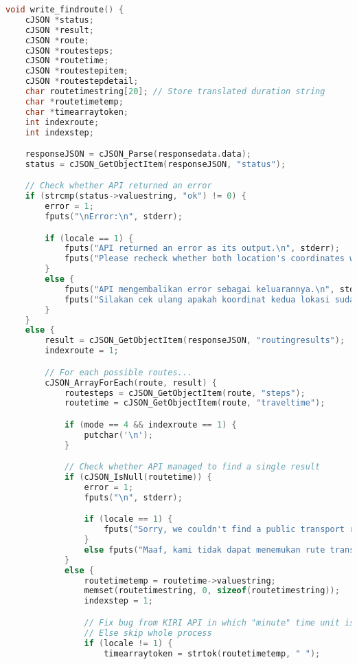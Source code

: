 \begin{lstlisting}[label={appdx:A-write-searchplacenoreturns}, language=C, caption=\texttt{write\textunderscore searchplace\textunderscore noreturns()}]
void write_findroute() {
    cJSON *status;
    cJSON *result;
    cJSON *route;
    cJSON *routesteps;
    cJSON *routetime;
    cJSON *routestepitem;
    cJSON *routestepdetail;
    char routetimestring[20]; // Store translated duration string
    char *routetimetemp;
    char *timearraytoken;
    int indexroute;
    int indexstep;

    responseJSON = cJSON_Parse(responsedata.data);
    status = cJSON_GetObjectItem(responseJSON, "status");

    // Check whether API returned an error
    if (strcmp(status->valuestring, "ok") != 0) {
        error = 1;
        fputs("\nError:\n", stderr);

        if (locale == 1) {
            fputs("API returned an error as its output.\n", stderr);
            fputs("Please recheck whether both location's coordinates were inputted correctly.\n", stderr);
        }
        else {
            fputs("API mengembalikan error sebagai keluarannya.\n", stderr);
            fputs("Silakan cek ulang apakah koordinat kedua lokasi sudah dimasukkan dengan benar.\n", stderr);
        }
    }
    else {
        result = cJSON_GetObjectItem(responseJSON, "routingresults");
        indexroute = 1;

        // For each possible routes...
        cJSON_ArrayForEach(route, result) {
            routesteps = cJSON_GetObjectItem(route, "steps");
            routetime = cJSON_GetObjectItem(route, "traveltime");

            if (mode == 4 && indexroute == 1) {
                putchar('\n');
            }

            // Check whether API managed to find a single result
            if (cJSON_IsNull(routetime)) {
                error = 1;
                fputs("\n", stderr);

                if (locale == 1) {
                    fputs("Sorry, we couldn't find a public transport route for your trip.\n", stderr);
                }
                else fputs("Maaf, kami tidak dapat menemukan rute transportasi publik untuk perjalanan anda.\n", stderr);
            }
            else {
                routetimetemp = routetime->valuestring;
                memset(routetimestring, 0, sizeof(routetimestring));
                indexstep = 1;

                // Fix bug from KIRI API in which "minute" time unit is not translated in id
                // Else skip whole process
                if (locale != 1) {
                    timearraytoken = strtok(routetimetemp, " ");


\end{lstlisting}
